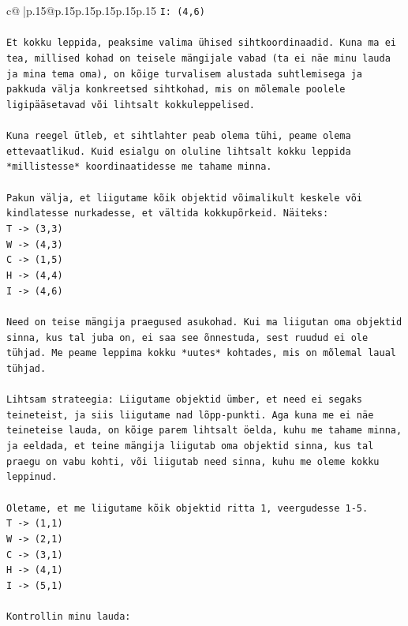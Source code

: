 \documentclass{article}
\begin{document}
{\begin{supertabular}{c@{$\;$}|p{.15\linewidth}@{}p{.15\linewidth}p{.15\linewidth}p{.15\linewidth}p{.15\linewidth}p{.15\linewidth}}
{{{\texttt{I: (4,6)} \\
\\ 
\texttt{Et kokku leppida, peaksime valima ühised sihtkoordinaadid. Kuna ma ei tea, millised kohad on teisele mängijale vabad (ta ei näe minu lauda ja mina tema oma), on kõige turvalisem alustada suhtlemisega ja pakkuda välja konkreetsed sihtkohad, mis on mõlemale poolele ligipääsetavad või lihtsalt kokkuleppelised.} \\
\\ 
\texttt{Kuna reegel ütleb, et sihtlahter peab olema tühi, peame olema ettevaatlikud. Kuid esialgu on oluline lihtsalt kokku leppida *millistesse* koordinaatidesse me tahame minna.} \\
\\ 
\texttt{Pakun välja, et liigutame kõik objektid võimalikult keskele või kindlatesse nurkadesse, et vältida kokkupõrkeid. Näiteks:} \\
\texttt{T {-}> (3,3)} \\
\texttt{W {-}> (4,3)} \\
\texttt{C {-}> (1,5)} \\
\texttt{H {-}> (4,4)} \\
\texttt{I {-}> (4,6)} \\
\\ 
\texttt{Need on teise mängija praegused asukohad. Kui ma liigutan oma objektid sinna, kus tal juba on, ei saa see õnnestuda, sest ruudud ei ole tühjad. Me peame leppima kokku *uutes* kohtades, mis on mõlemal laual tühjad.} \\
\\ 
\texttt{Lihtsam strateegia: Liigutame objektid ümber, et need ei segaks teineteist, ja siis liigutame nad lõpp{-}punkti. Aga kuna me ei näe teineteise lauda, on kõige parem lihtsalt öelda, kuhu me tahame minna, ja eeldada, et teine mängija liigutab oma objektid sinna, kus tal praegu on vabu kohti, või liigutab need sinna, kuhu me oleme kokku leppinud.} \\
\\ 
\texttt{Oletame, et me liigutame kõik objektid ritta 1, veergudesse 1{-}5.} \\
\texttt{T {-}> (1,1)} \\
\texttt{W {-}> (2,1)} \\
\texttt{C {-}> (3,1)} \\
\texttt{H {-}> (4,1)} \\
\texttt{I {-}> (5,1)} \\
\\ 
\texttt{Kontrollin minu lauda:} \\
}}}
\end{supertabular}}
\end{document}
